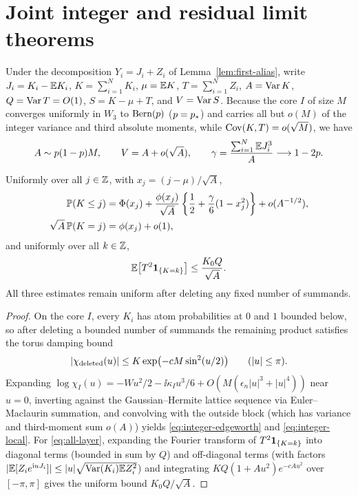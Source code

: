 \section{Joint integer and residual limit theorems}\label{sec:joint}

Under the decomposition $Y_i=J_i+Z_i$ of Lemma~\ref{lem:first-alias}, write
$J_i=K_i-\mathbb E K_i$, $K=\sum_{i=1}^N K_i$, $\mu=\mathbb E K$, $T=\sum_{i=1}^N Z_i$,
$A=\operatorname{Var} K$, $Q=\operatorname{Var} T=O(1)$, $S=K-\mu+T$, and $V=\operatorname{Var} S$. Because the core
$I$ of size $M$ converges uniformly in $W_3$ to $\operatorname{Bern}(p)$ ($p=p_*$) and
carries all but $o(M)$ of the integer variance and third absolute moments,
while $\operatorname{Cov}(K,T)=o(\sqrt M)$, we have
\begin{equation}\label{eq:joint-moments}
 A\sim p(1-p)M,\qquad V=A+o(\sqrt A),\qquad
 \gamma=\frac{\sum_{i=1}^N\mathbb E J_i^3}{A}\longrightarrow1-2p.
\end{equation}

\begin{lemma}\label{lem:integer}
Uniformly over all $j\in\mathbb Z$, with $x_j=(j-\mu)/\sqrt A$,
\begin{align}
 \mathbb P(K\le j)&=\Phi(x_j)+\frac{\phi(x_j)}{\sqrt A}
             \left\{\frac12+\frac\gamma6(1-x_j^2)\right\}
                        +o(A^{-1/2}),\label{eq:integer-edgeworth}\\
 \sqrt A\,\mathbb P(K=j)&=\phi(x_j)+o(1),\label{eq:integer-local}
\end{align}
and uniformly over all $k\in\mathbb Z$,
\begin{equation}\label{eq:all-layer}
                  \mathbb E\bigl[T^2\mathbf1_{\{K=k\}}\bigr]\le \frac{K_0 Q}{\sqrt A}.
\end{equation}
All three estimates remain uniform after deleting any fixed number of
summands.
\end{lemma}
\begin{proof}
On the core $I$, every $K_i$ has atom probabilities at $0$ and $1$ bounded
below, so after deleting a bounded number of summands the remaining product
satisfies the torus damping bound
\begin{equation}\label{eq:torus-damping}
        |\chi_{\rm deleted}(u)|\le K\exp\bigl(-cM\sin^2(u/2)\bigr)
                                                   \qquad(|u|\le\pi).
\end{equation}
Expanding $\log\chi_I(u)=-Wu^2/2-\ii\kappa_Iu^3/6+O(M(\epsilon_n|u|^3+|u|^4))$
near $u=0$, inverting against the Gaussian--Hermite lattice sequence via
Euler--Maclaurin summation, and convolving with the outside block (which has
variance and third-moment sum $o(A)$) yields \eqref{eq:integer-edgeworth}
and \eqref{eq:integer-local}. For \eqref{eq:all-layer}, expanding the Fourier
transform of $T^2\mathbf1_{\{K=k\}}$ into diagonal terms (bounded in sum by $Q$)
and off-diagonal terms (with factors $|\mathbb E[Z_ie^{\mathrm i uJ_i}]|\le|u|\sqrt{\operatorname{Var}(K_i)\mathbb E Z_i^2}$)
and integrating $KQ(1+Au^2)e^{-cAu^2}$ over $[-\pi,\pi]$ gives the uniform
bound $K_0Q/\sqrt A$.
\end{proof}

